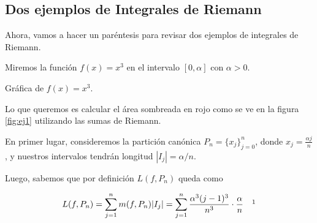 \subsection{Dos ejemplos de Integrales de Riemann}

Ahora, vamos a hacer un paréntesis para revisar dos ejemplos de integrales de Riemann.

\begin{ejem}
    Miremos la función $f(x) = x^3$ en el intervalo $[0,\alpha]$ con $\alpha > 0$.
\end{ejem}
    
\begin{marginfigure}
        \centering
        \caption{\footnotesize Gráfica de $f(x) = x^3$.}
        \label{fig:ej1}
\end{marginfigure}
    
Lo que queremos es calcular el área sombreada en rojo como se ve en la figura \ref{fig:ej1} utilizando las sumas de Riemann.
    
En primer lugar, consideremos la partición canónica $P_n = \{ x_j \}_{j=0}^n$, donde $x_j = \frac{\alpha j}{n}$, y nuestros intervalos tendrán longitud $|I_j| = \alpha/n$.

Luego, sabemos que por definición $L(f,P_n)$ queda como

\[
L(f,P_n) = \sum_{j=1}^n m(f,P_n)|I_j| = \sum_{j=1}^n \frac{\alpha^3(j-1)^3}{n^3} \cdot \frac{\alpha}{n} \quad \footnotemark
\]

